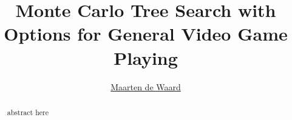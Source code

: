 \documentclass[a4]{report}
\title{Monte Carlo Tree Search with Options for General Video Game Playing}
\author{\href{mailto:mrtndwrd@gmail.com}{Maarten de Waard}}
\begin{document}

\maketitle

\begin{abstract}
	abstract here
\end{abstract}

\tableofcontents


















\end{document}
